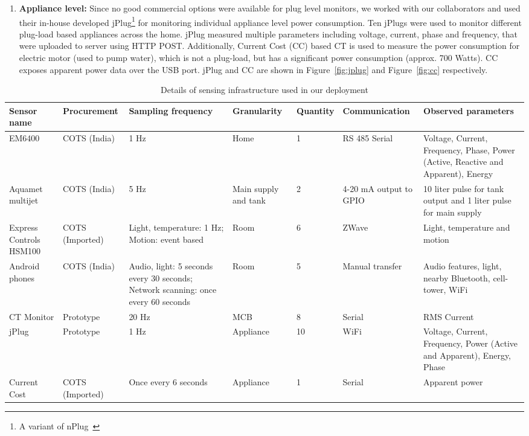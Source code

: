 \documentclass[10pt]{sensys-proc}
\newcommand{\figref}[1]{Figure~\ref{#1}}
\begin{document}
\begin{enumerate}[leftmargin=1em]
\vspace{-1.5mm} \item \textbf{Appliance level:} Since no good commercial options were available for plug level monitors, we worked with our collaborators and used their in-house developed jPlug\footnote{A variant of nPlug~\cite{nplug}} for monitoring individual appliance level power consumption. Ten jPlugs were used to monitor different plug-load based appliances across the home. 
jPlug measured multiple parameters including voltage, current, phase and frequency, that were uploaded to server using HTTP POST. Additionally, Current Cost (CC) based CT is used to measure the power consumption for electric motor (used to pump water), which is not a plug-load, but has a significant power consumption (approx. 700 Watts). CC exposes apparent power data over the USB port.  jPlug and CC are shown in \figref{fig:jplug} and \figref{fig:cc} respectively.
\end{enumerate}
\begin{table}[t!]
\footnotesize
\centering
\vspace{-4mm}
\caption{Details of sensing infrastructure used in our deployment}
\vspace{-4mm}
\label{tab:sensing}
\tabcolsep=0.015cm
\begin{center}
\begin{tabular}{|p{1.7cm}|p{2.0cm}|p{3.3cm}|p{1.5cm}|p{1.5cm}|p{2.0cm}|p{5.2cm}|}
\hline
\textbf{Sensor name} & \textbf{Procurement} & \textbf{Sampling frequency} & \textbf{Granularity} & \textbf{Quantity} & \textbf{Communication} & \textbf{Observed parameters}\\
\hline

EM6400& COTS (India)&1 Hz&Home&1&RS 485 Serial&Voltage, Current, Frequency, Phase, Power (Active, Reactive and Apparent), Energy\\ \hline
Aquamet multijet & COTS (India) &5 Hz&Main supply and tank&2&4-20 mA output to GPIO &10 liter pulse for tank output and 1 liter pulse for main supply\\ \hline
Express Controls HSM100 &COTS (Imported)&Light, temperature: 1 Hz; Motion: event based &Room &6&ZWave&Light, temperature and motion\\ \hline
Android phones &COTS (India) & Audio, light: 5 seconds every 30 seconds; Network scanning: once every 60 seconds&Room&5&Manual transfer&Audio features, light, nearby Bluetooth, cell-tower, WiFi\\ \hline
CT Monitor&Prototype &20 Hz&MCB&8&Serial&RMS Current \\\hline
jPlug& Prototype &1 Hz &Appliance&10&WiFi&Voltage, Current, Frequency, Power (Active and Apparent), Energy, Phase\\ \hline	
Current Cost&COTS (Imported)& Once every 6 seconds &Appliance&1&Serial&Apparent power\\ \hline
\end{tabular}
\end{center}
\vspace{-6mm}
\end{table}
\end{document}
